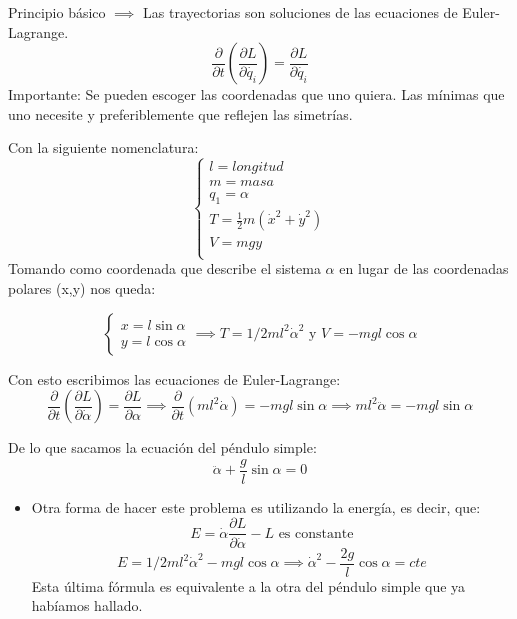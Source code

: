 Principio básico $\implies$ Las trayectorias son soluciones de las ecuaciones de Euler-Lagrange. $$\frac{\partial}{\partial t}\left(\frac{\partial L}{\partial\dot{q_i}}\right) = \frac{\partial L}{\partial \dot{q_i}}$$
Importante: Se pueden escoger las coordenadas que uno quiera. Las mínimas que uno necesite y preferiblemente que reflejen las simetrías.
\begin{example}

Con la siguiente nomenclatura:
	$$\begin{cases}
		l= longitud\\
		m=masa\\
		q_1=\alpha\\
		T = \frac{1}{2} m (\dot x^2 + \dot y^2)\\
		V=mgy\\
	\end{cases}$$
	Tomando como coordenada que describe el sistema $\alpha$ en lugar de las coordenadas polares (x,y) nos queda:

	\[\begin{cases}
	x=l\sin\alpha\\
	y=l\cos\alpha
	\end{cases}
	\implies T = 1/2 m l^2 \dot\alpha^2 \text{ y } V = -m g l \cos\alpha\]

	Con esto escribimos las ecuaciones de Euler-Lagrange:\\
	$$\frac{\partial}{\partial t}\left(\frac{\partial L}{\partial \dot\alpha}\right) = \frac{\partial L}{\partial\alpha} \implies \frac{\partial}{\partial t}(m l^2 \dot\alpha) = -m g l\sin\alpha \implies ml^2\ddot\alpha = -m g l \sin\alpha$$

	De lo que sacamos la ecuación del péndulo simple:
	$$\ddot\alpha + \frac{g}{l} \sin\alpha = 0$$
	\begin{itemize}
	\item Otra forma de hacer este problema es utilizando la energía, es decir, que:
	$$E = \dot\alpha \frac{\partial L}{\partial\dot\alpha} - L \text{  es constante}$$
	$$E = 1/2 m l^2\dot\alpha^2 - mgl\cos\alpha \implies \dot\alpha^2 - \frac{2g}{l}\cos\alpha = cte$$
	Esta última fórmula es equivalente a la otra del péndulo simple que ya habíamos hallado.
	\end{itemize}
\end{example}

